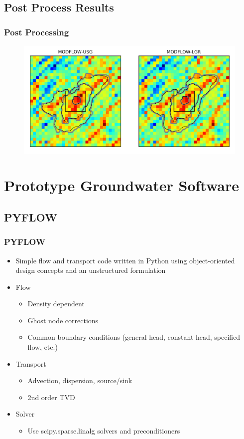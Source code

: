 \documentclass[t]{beamer}
\begin{document}
\subsection{Post Process Results}
\begin{frame}[fragile]
\frametitle{Post Processing}
  \begin{figure}[ht]
  \centering
         \includegraphics[scale=0.6]{figures/lgr-usg.png}
   \end{figure}
\end{frame}


\section{Prototype Groundwater Software}
\subsection{PYFLOW}

\begin{frame}[fragile]
\frametitle{PYFLOW}
   \begin{itemize}
      \item{Simple flow and transport code written in Python using object-oriented design concepts and an unstructured formulation}
      \item{Flow}
         \begin{itemize}
            \item{Density dependent}
            \item{Ghost node corrections}
            \item{Common boundary conditions (general head, constant head, specified flow, etc.)}
         \end{itemize}
      \item{Transport}
         \begin{itemize}
            \item{Advection, dispersion, source/sink}
            \item{2nd order TVD}
         \end{itemize}
      \item{Solver}
         \begin{itemize}
            \item{Use scipy.sparse.linalg solvers and preconditioners}
         \end{itemize}
   \end{itemize}
\end{frame}
\end{document}

